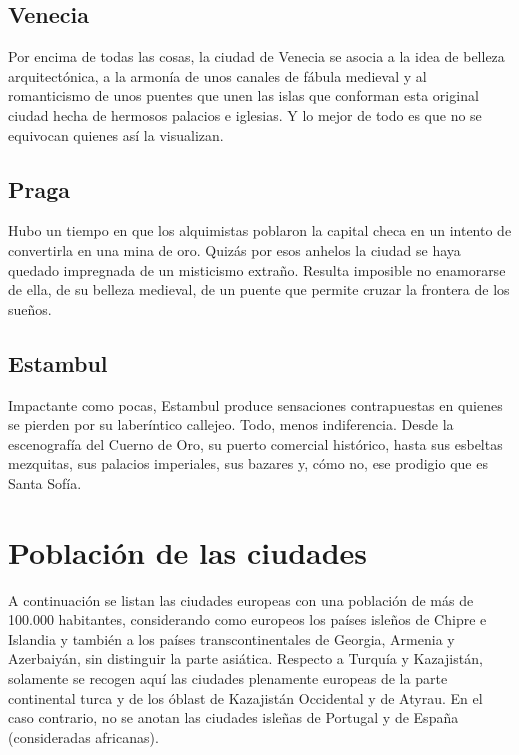 \documentclass[10pt,letterpaper,oneside]{book}
\begin{document}
		\section{Venecia}
			Por encima de todas las cosas, la ciudad de Venecia se asocia a la idea de belleza arquitectónica, a la armonía de unos canales de fábula medieval y al romanticismo de unos puentes que unen las islas que conforman esta original ciudad hecha de hermosos palacios e iglesias. Y lo mejor de todo es que no se equivocan quienes así la visualizan.
		\section{Praga}
			Hubo un tiempo en que los alquimistas poblaron la capital checa en un intento de convertirla en una mina de oro. Quizás por esos anhelos la ciudad se haya quedado impregnada de un misticismo extraño. Resulta imposible no enamorarse de ella, de su belleza medieval, de un puente que permite cruzar la frontera de los sueños. 
		\section{Estambul}
			Impactante como pocas, Estambul produce sensaciones contrapuestas en quienes se pierden por su laberíntico callejeo. Todo, menos indiferencia. Desde la escenografía del Cuerno de Oro, su puerto comercial histórico, hasta sus esbeltas mezquitas, sus palacios imperiales, sus bazares y, cómo no, ese prodigio que es Santa Sofía.
					
\chapter{Población de las ciudades}
A continuación se listan las ciudades europeas con una población de más de 100.000 habitantes, considerando como europeos los países isleños de Chipre e Islandia y también a los países transcontinentales de Georgia, Armenia y Azerbaiyán, sin distinguir la parte asiática. Respecto a Turquía y Kazajistán, solamente se recogen aquí las ciudades plenamente europeas de la parte continental turca y de los óblast de Kazajistán Occidental y de Atyrau. En el caso contrario, no se anotan las ciudades isleñas de Portugal y de España (consideradas africanas).
\end{document}
